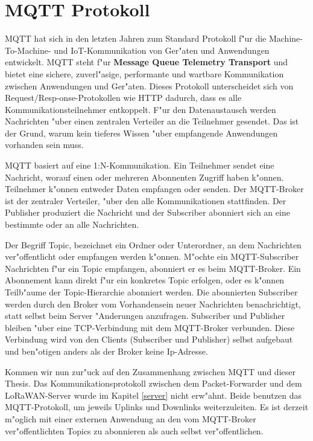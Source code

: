 \section{MQTT Protokoll}

MQTT hat sich in den letzten Jahren zum Standard Protokoll f"ur die
Machine-To-Machine- und IoT-Kommunikation von Ger"aten und Anwendungen
entwickelt. MQTT steht f"ur \textbf{Message Queue Telemetry Transport}
und bietet eine sichere, zuverl"asige, performante und wartbare
Kommunikation zwischen Anwendungen und Ger"aten. Dieses Protokoll
unterscheidet sich von Request/Resp-onse-Protokollen wie \ac{HTTP} 
dadurch, dass es alle Kommunikationsteilnehmer entkoppelt. F"ur den
Datenaustausch werden Nachrichten "uber einen zentralen Verteiler an 
die Teilnehmer gesendet. Das ist der Grund, warum kein tieferes Wissen 
"uber empfangende Anwendungen vorhanden sein muss.

MQTT basiert auf eine 1:N-Kommunikation. Ein Teilnehmer sendet eine
Nachricht, worauf einen oder mehreren Abonnenten Zugriff haben k"onnen.
Teilnehmer k"onnen entweder Daten empfangen oder senden. Der MQTT-Broker
ist der zentraler Verteiler, "uber den alle Kommunikationen stattfinden.
Der Publisher produziert die Nachricht und der Subscriber abonniert
sich an eine bestimmte oder an alle Nachrichten. 

Der Begriff  Topic, bezeichnet ein Ordner oder Unterordner, an dem
Nachrichten ver"offentlicht oder empfangen werden k"onnen. M"ochte ein
MQTT-Subscriber Nachrichten f"ur ein Topic empfangen, abonniert er es
beim MQTT-Broker. Ein Abonnement kann direkt f"ur ein konkretes Topic
erfolgen, oder es k"onnen Teilb"aume der Topic-Hierarchie abonniert
werden. Die abonnierten Subscriber werden durch den Broker vom
Vorhandensein neuer Nachrichten benachrichtigt, statt selbst beim 
Server "Anderungen anzufragen. Subscriber und Publisher bleiben "uber 
eine \ac{TCP}-Verbindung mit dem MQTT-Broker verbunden. Diese 
Verbindung wird von den Clients (Subscriber und Publisher) selbst 
aufgebaut und ben"otigen anders als der Broker keine Ip-Adresse. 

\vspace{2cm}
Kommen wir nun zur"uck auf den Zusammenhang zwischen MQTT und dieser
Thesis. Das Kommunikationsprotokoll zwischen dem Packet-Forwarder und 
dem LoRaWAN-Server wurde im Kapitel \ref{server} nicht erw"ahnt. Beide
benutzen das MQTT-Protokoll, um jeweils Uplinks und Downlinks
weiterzuleiten. Es ist derzeit m"oglich mit einer externen Anwendung an
den vom MQTT-Broker ver"offentlichten Topics zu abonnieren als auch 
selbst ver"offentlichen.

